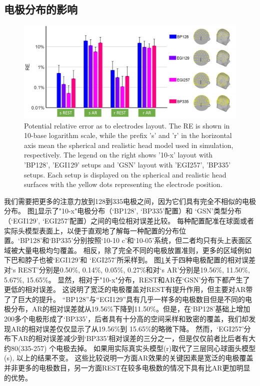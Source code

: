 \subsection{电极分布的影响}
\begin{figure}[h!]
	\centering
	\includegraphics[width=15cm]{pic/JNE/figure5.png}
	\caption{Potential relative error as to electrodes layout. The RE is shown in 10-base logarithm scale, while the prefix 's' and 'r' in the horizontal axis mean the spherical and realistic head model used in simulation, respectively. The legend on the right shows '10-x' layout with 'BP128', 'EGI129' setups and 'GSN' layout with 'EGI257', 'BP335' setups. Each setup is displayed on the spherical and realistic head surfaces with the yellow dots representing the electrode position.}
	\label{2.5}
\end{figure}
我们需要把更多的注意力放到128到335电极之间，因为它们具有完全不相似的电极分布。 图\ref{2.5}显示了"10-x"电极分布（‘BP128’, ‘BP335’配置）和 ‘GSN’类型分布（‘EGI129’, ‘EGI257’配置）之间的电位相对误差比较。 每种配置配准在球面或者实际头模型表面上，以便于直观地了解每一种配置的分布位置。‘BP128’和‘BP335’分别按照‘10-10 c’和‘10-05’系统，但二者均只有头上表面区域被大量电极均匀覆盖。 相反，除了完全不同的电极放置准则，更多的区域例如下巴和脖子也被‘EGI129’和
‘EGI257’所采样到。 图\ref{2.5}关于四种电极配置的相对误差对‘s REST’分别是0.50\%, 0.14\%, 0.05\%, 0.27\%和对‘s AR’分别是19.56\%, 11.50\%, 5.67\%, 15.65\%。 显然，相对于"10-x"分布，REST和AR在‘GSN’分布下都产生了更低的相对误差。 这说明了宽泛的电极覆盖对REST有提升作用，但主要对AR带了了巨大的提升。 “BP128”与“EGI129”具有几乎一样多的电极数目但是不同的电极分布，AR的相对误差就从19.56\%下降到11.50\%。但是，在‘BP128’基础上增加200多个电极形成了‘BP335’，后者具有十分高的空间采样和致密的覆盖，我们却发现AR的相对误差仅仅显示了从19.56\%到 
15.65\%的略微下降。 然而，‘EGI257’分布下AR的相对误差减少到‘BP335’相对误差的三分之一，但是仅仅前者比后者有大约80(335-257) 个电极去掉。 如果用实际真实头模型(r)取代了三层同心球面头模型(s), 以上的结果不变。 这些比较说明一方面AR效果的关键因素是宽泛的电极覆盖并非更多的电极数目，另一方面REST在较多电极数的情况下具有比AR更加明显的优势。

